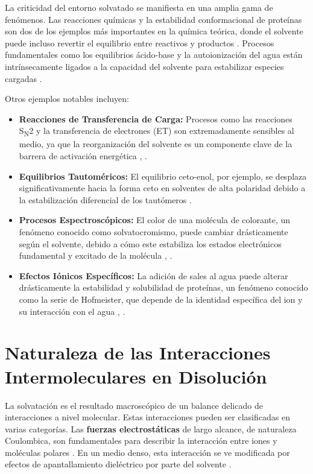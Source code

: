 La criticidad del entorno solvatado se manifiesta en una amplia gama de fenómenos. Las reacciones químicas y la estabilidad conformacional de proteínas son dos de los ejemplos más importantes en la química teórica, donde el solvente puede incluso revertir el equilibrio entre reactivos y productos \cite[8, 102]{hirata2003molecular}. Procesos fundamentales como los equilibrios ácido-base y la autoionización del agua están intrínsecamente ligados a la capacidad del solvente para estabilizar especies cargadas \cite[86, 89]{hirata2003molecular}.

Otros ejemplos notables incluyen:
\begin{itemize}
    \item \textbf{Reacciones de Transferencia de Carga:} Procesos como las reacciones S\textsubscript{N}2 y la transferencia de electrones (ET) son extremadamente sensibles al medio, ya que la reorganización del solvente es un componente clave de la barrera de activación energética \cite[98, 102]{hirata2003molecular}, \cite[4]{nishiyama2021molecular}.
    \item \textbf{Equilibrios Tautoméricos:} El equilibrio ceto-enol, por ejemplo, se desplaza significativamente hacia la forma ceto en solventes de alta polaridad debido a la estabilización diferencial de los tautómeros \cite[93]{hirata2003molecular}.
    \item \textbf{Procesos Espectroscópicos:} El color de una molécula de colorante, un fenómeno conocido como solvatocromismo, puede cambiar drásticamente según el solvente, debido a cómo este estabiliza los estados electrónicos fundamental y excitado de la molécula \cite[12]{hirata2003molecular}, \cite[2]{canuto2010solvation}.
    \item \textbf{Efectos Iónicos Específicos:} La adición de sales al agua puede alterar drásticamente la estabilidad y solubilidad de proteínas, un fenómeno conocido como la serie de Hofmeister, que depende de la identidad específica del ion y su interacción con el agua \cite[146]{hirata2003molecular}, \cite[3]{marcus2015ions}.
\end{itemize}

\section{Naturaleza de las Interacciones Intermoleculares en Disolución}

La solvatación es el resultado macroscópico de un balance delicado de interacciones a nivel molecular. Estas interacciones pueden ser clasificadas en varias categorías. Las \textbf{fuerzas electrostáticas} de largo alcance, de naturaleza Coulombica, son fundamentales para describir la interacción entre iones y moléculas polares \cite[8]{hirata2003molecular}. En un medio denso, esta interacción se ve modificada por efectos de apantallamiento dieléctrico por parte del solvente \cite[26]{hirata2003molecular}.

